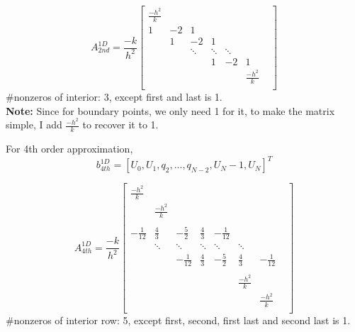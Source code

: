 \documentclass[a4paper]{article}
\begin{document}
\[
A_{2nd}^{1D}
= \frac{-k}{h^2}
\begin{bmatrix}
    
    \frac{-h^2}{k}  &  &   & & & \\
    1  & -2 & 1  &   &  &\\
       & 1  & -2 & 1  &  & \\
     & & \ddots & \ddots & \ddots & & \\
     & & & 1 & -2  & 1&\\
     & & &  &  & \frac{-h^2}{k} \\
\end{bmatrix}
\]
\#nonzeros of interior: 3, except first and last is 1.  \\
\textbf{Note:} Since for boundary points, we only need 1 for it, to make the matrix simple, I add $\frac{-h^2}{k}$ to recover it to 1.

For 4th order approximation, 
$$b_{4th}^{1D} = [ U_0, U_1, q_2,...,q_{N-2}, U_N-1,U_N ]^T$$

\[
A_{4th}^{1D}
= \frac{-k}{h^2}
\begin{bmatrix}
    
    \frac{-h^2}{k}   &  &   & & & &\\
       & \frac{-h^2}{k} &   &   &  & &\\\\
     -\frac{1}{12}  & \frac{4}{3}  & -\frac{5}{2} & \frac{4}{3}  & - \frac{1}{12} & &&\\
     & \ddots& \ddots & \ddots & \ddots & \ddots & \\
    && -\frac{1}{12}  & \frac{4}{3}  & -\frac{5}{2} & \frac{4}{3}  & - \frac{1}{12} \\\\
     & & & &  &  \frac{-h^2}{k}  & \\
     & & & &  & &\frac{-h^2}{k}  \\
\end{bmatrix}
\]
\#nonzeros of interior row: 5, except first, second, first last and second last is 1.
\end{document}
